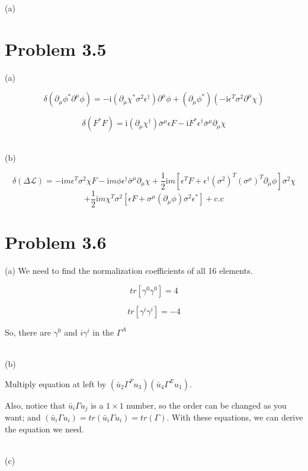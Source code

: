 \documentclass[11pt]{article} %
\begin{document}
\noindent (a)

\section{Problem 3.5}
\noindent (a)

\[
    \delta\left(\partial_{\mu} \phi^{*} \partial^{\mu} \phi\right) = - \mathrm{i}\left(\partial_{\mu} \chi^{*} \sigma^{2} \epsilon^{\dagger}\right) \partial^{\mu} \phi+\left(\partial_{\mu} \phi^{*}\right)\left(-\mathrm{i} \epsilon^{T} \sigma^{2} \partial^{\mu} \chi\right)
\]

\[
    \delta\left(F^{*} F\right)=\mathrm{i}\left(\partial_{\mu} \chi^{\dagger}\right) \bar{\sigma}^{\mu} \epsilon F-\mathrm{i} F^{*} \epsilon^{\dagger} \bar{\sigma}^{\mu} \partial_{\mu} \chi
\]


~\\
\noindent (b)

\[
    \delta(\Delta \mathcal{L})=-\mathrm{i} m \epsilon^{T} \sigma^{2} \chi F-\mathrm{i} m \phi \epsilon^{\dagger} \bar{\sigma}^{\mu} \partial_{\mu} \chi+\frac{1}{2} \mathrm{i} m\left[\epsilon^{T} F+\epsilon^{\dagger}\left(\sigma^{2}\right)^{T}\left(\sigma^{\mu}\right)^{T} \partial_{\mu} \phi\right] \sigma^{2} \chi
\]
\[
    +\frac{1}{2} \mathrm{i} m \chi^{T} \sigma^{2}\left[\epsilon F+\sigma^{\mu}\left(\partial_{\mu} \phi\right) \sigma^{2} \epsilon^{*}\right]+\mathrm{c.c}
\]


\section{Problem 3.6}

\noindent (a)
We need to find the normalization coefficients of all 16 elements.

\[
    tr[\gamma^0 \gamma^0] = 4
\]

\[
    tr[\gamma^i \gamma^i] = -4
\]

So, there are $\gamma^0$ and $i \gamma^i$ in the $\Gamma^A$

~\\
\noindent (b)

Multiply equation at left by $(\bar{u}_2 \Gamma^F u_3)(\bar{u}_4 \Gamma^E u_1)$.

Also, notice that $\bar{u}_i \Gamma u_j$ is a $1\times 1$ number, so the order can be changed as you want; and $(\bar{u}_i \Gamma u_i) = {tr} (\bar{u}_i \Gamma u_i) = {tr} (\Gamma)$. With these equations, we can derive the equation we need.

~\\
\noindent (c)
\end{document}

